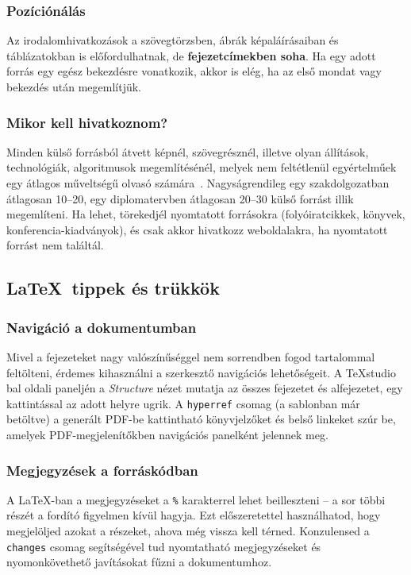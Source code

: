 \documentclass{sapientia-thesis}
\begin{document}
\subsubsection{Pozíciónálás}
Az irodalomhivatkozások a szövegtörzsben, ábrák képaláírásaiban és táblázatokban is előfordulhatnak, de \textbf{fejezetcímekben soha}. Ha egy adott forrás egy egész bekezdésre vonatkozik, akkor is elég, ha az első mondat vagy bekezdés után megemlítjük.

\subsubsection{Mikor kell hivatkoznom?}
Minden külső forrásból átvett képnél, szövegrésznél, illetve olyan állítások, technológiák, algoritmusok megemlítésénél, melyek nem feltétlenül egyértelműek egy átlagos műveltségű olvasó számára~\cite{piczak2015esc}. Nagyságrendileg egy szakdolgozatban átlagosan 10--20, egy diplomatervben átlagosan 20--30 külső forrást illik megemlíteni. Ha lehet, törekedjél nyomtatott forrásokra (folyóiratcikkek, könyvek, konferencia-kiadványok), és csak akkor hivatkozz weboldalakra, ha nyomtatott forrást nem találtál.

\subsection{\LaTeX\ tippek és trükkök}

\subsubsection{Navigáció a dokumentumban}
Mivel a fejezeteket nagy valószínűséggel nem sorrendben fogod tartalommal feltölteni, érdemes kihasználni a szerkesztő navigációs lehetőségeit. A TeXstudio bal oldali paneljén a \textit{Structure} nézet mutatja az összes fejezetet és alfejezetet, egy kattintással az adott helyre ugrik. A \texttt{hyperref} csomag (a sablonban már betöltve) a generált PDF-be kattintható könyvjelzőket és belső linkeket szúr be, amelyek PDF-megjelenítőkben navigációs panelként jelennek meg.

\subsubsection{Megjegyzések a forráskódban}
A \LaTeX-ban a megjegyzéseket a \verb|%| karakterrel lehet beilleszteni -- a sor többi részét a fordító figyelmen kívül hagyja. Ezt előszeretettel használhatod, hogy megjelöljed azokat a részeket, ahova még vissza kell térned. Konzulensed a \texttt{changes} csomag segítségével tud nyomtatható megjegyzéseket és nyomonkövethető javításokat fűzni a dokumentumhoz.
\end{document}
